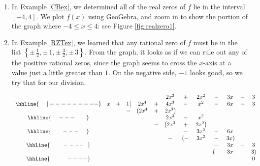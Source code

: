 {
\begin{enumerate}

\item  In Example \ref{CBex}, we determined all of the real zeros of $f$ lie in the interval $[-4, 4]$.  We plot $f(x)$ using GeoGebra, and zoom in to show the portion of the graph where $-4\leq x\leq 4$: see Figure \ref{fig:realzero1}.



\item  In Example \ref{RZTex}, we learned that any rational zero of $f$ must be in the list $\left\{\pm \, \frac{1}{2}, \pm \, 1, \pm \, \frac{3}{2}, \pm \, 3\right\}$.  From the graph, it looks as if we can rule out any of the positive rational zeros, since the graph seems to cross the $x$-axis at a value just a little greater than $1$. On the negative side, $-1$ looks good, so we try that for our  division.

{

\setlength\arraycolsep{0.1pt}
\setlength\extrarowheight{2pt}

\[
\begin{array}{ccccccccccccc}

 & & & & & &2x^3 & +& 2x^2 & - &3x  & - & 3 \\ \hhline{~~~~|---------}

   & x & + & 1 \, \vline& 2x^4 & + & 4x^3 & - & x^2 & - & 6x & - & 3 \\

  &  &  &  -& \left(2x^4 \right.& + & \left.2x^3\right) &  &  &  &  &    \\ \hhline{~~~~---~~~~~~} 
  &  &  &   &    &   &  2x^3    & - & x^2 &  &  &  &  \\ 
  &  &  &   &    & - &  \left(2x^3\right. & +  & \left. 2x^2\right) & &  &  &     \\ 
\hhline{~~~~~~---~~~~} 
  &  &  &   &    &   &                    &  - & 3x^2 & - & 6x & & \\
  &  &  &   &    &   &                  - &\left(-\right. & 3x^2 & - & \left.3x\right) & & \\
 \hhline{~~~~~~~----~~}   
  &  &  &   &    &   &  &  &  & - & 3x & - &3 \\
  &  &  &   &    &   &  &  & - &\left(-\right. & 3x & - & \left.3\right)\\
 \hhline{~~~~~~~~~----}
  &  &  &   &    &   &  &  &   &               &    &   & 0 


\end{array}\]}
\end{enumerate}}
